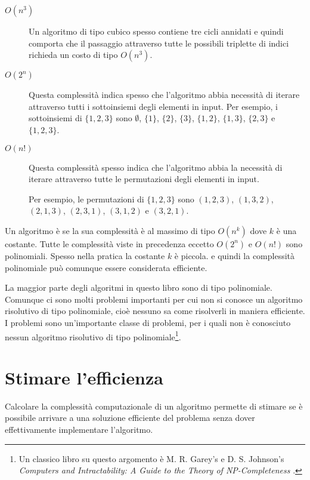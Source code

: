 \begin{description}
\item[$O(n^3)$]
Un algoritmo di tipo cubico spesso contiene tre cicli 
annidati e quindi comporta che 
il passaggio attraverso tutte le possibili triplette di 
indici richieda un costo di tipo $O(n^3)$.

\item[$O(2^n)$]
Questa complessità indica spesso che l'algoritmo 
abbia necessità di iterare attraverso tutti i sottoinsiemi 
degli elementi in input.
Per esempio, i sottoinsiemi di $\{1,2,3\}$ sono
$\emptyset$, $\{1\}$, $\{2\}$, $\{3\}$, $\{1,2\}$,
$\{1,3\}$, $\{2,3\}$ e $\{1,2,3\}$.

\item[$O(n!)$]
Questa complessità spesso indica che l'algoritmo 
abbia la necessità di iterare attraverso tutte
le permutazioni degli elementi in input.

Per esempio, le permutazioni di $\{1,2,3\}$ sono
$(1,2,3)$, $(1,3,2)$, $(2,1,3)$, $(2,3,1)$,
$(3,1,2)$ e $(3,2,1)$.

\end{description}

Un algoritmo è 
se la sua complessità è al massimo di tipo $O(n^k)$
dove $k$ è una costante.
Tutte le complessità viste in precedenza eccetto
$O(2^n)$ e $O(n!)$ sono polinomiali.
Spesso nella pratica la costante $k$ è piccola.
e quindi la complessità polinomiale
può comunque essere considerata efficiente.


La maggior parte degli algoritmi in questo libro
sono di tipo polinomiale.
Comunque ci sono molti problemi importanti per cui
non si conosce un algoritmo risolutivo di tipo polinomiale,
cioè nessuno sa come risolverli in maniera efficiente.
I problemi  sono un'importante classe di problemi, 
per i quali non è conosciuto nessun algoritmo 
risolutivo di tipo polinomiale\footnote{Un classico libro su questo argomento è
M. R. Garey's e D. S. Johnson's
\emph{Computers and Intractability: A Guide to the Theory
of NP-Completeness} \cite{gar79}.}.

\section{Stimare l'efficienza}

Calcolare la complessità computazionale di un algoritmo
permette di stimare se è possibile arrivare a una soluzione efficiente
del problema senza dover effettivamente implementare l'algoritmo.

